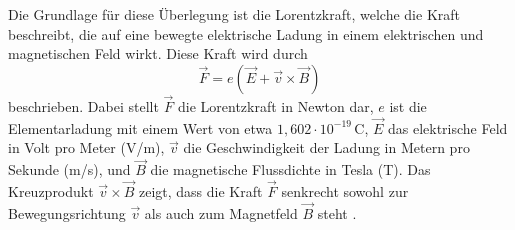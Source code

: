 \documentclass{article} %
\begin{document}
Die Grundlage für diese Überlegung ist die Lorentzkraft, welche die Kraft beschreibt, die auf eine bewegte elektrische Ladung in einem elektrischen und magnetischen Feld wirkt. Diese Kraft wird durch
$$
\vec{F} = e (\vec{E} + \vec{v} \times \vec{B})
$$
beschrieben. Dabei stellt \( \vec{F} \) die Lorentzkraft in Newton dar, \( e \) ist die Elementarladung mit einem Wert von etwa \( 1{,}602 \cdot 10^{-19} \, \mathrm{C}\), \( \vec{E} \) das elektrische Feld in Volt pro Meter (V/m), \( \vec{v} \) die Geschwindigkeit der Ladung in Metern pro Sekunde (m/s), und \( \vec{B} \) die magnetische Flussdichte in Tesla (T). Das Kreuzprodukt \( \vec{v} \times \vec{B} \) zeigt, dass die Kraft \( \vec{F} \) senkrecht sowohl zur Bewegungsrichtung \( \vec{v} \) als auch zum Magnetfeld \( \vec{B} \) steht \cite{rossnagel2003magnetron, mattox2010handbook, anders2010advances, kouznetsov1999new, prechtl2005grundlagen}.

\vspace{0.0em}
\end{document}
